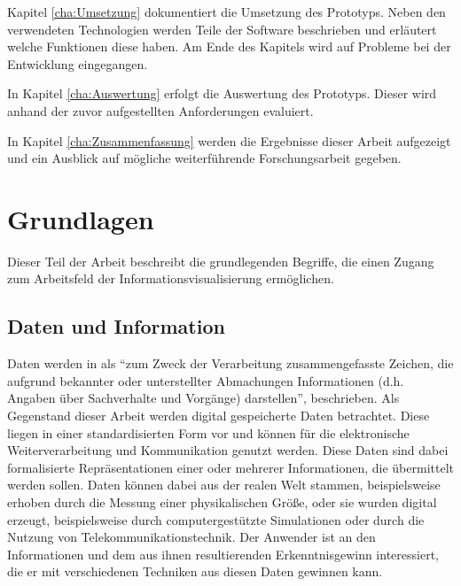 \documentclass[a4paper, 
               12pt,
               DIV=calc,
               version=first,
               pdftex,
               headsepline,
               footsepline,
               bibtotocnumbered,
               liststotocnumbered]{scrreprt}
\begin{document}
Kapitel \ref{cha:Umsetzung} dokumentiert die Umsetzung des Prototyps. Neben den verwendeten
Technologien werden Teile der Software beschrieben und erläutert welche Funktionen diese haben.
Am Ende des Kapitels wird auf Probleme bei der Entwicklung eingegangen.

In Kapitel \ref{cha:Auswertung} erfolgt die Auswertung des Prototyps. Dieser wird anhand der zuvor
aufgestellten Anforderungen evaluiert.

In Kapitel \ref{cha:Zusammenfassung} werden die Ergebnisse dieser Arbeit aufgezeigt und ein
Ausblick auf mögliche weiterführende Forschungsarbeit gegeben.

\chapter{Grundlagen}
\label{cha:Grundlagen}
Dieser Teil der Arbeit beschreibt die grundlegenden Begriffe, die einen Zugang
zum Arbeitsfeld der Informationsvisualisierung ermöglichen.
\section{Daten und Information}
\label{sec:DatenInfo}
Daten werden in \citep{Gabler} als "`zum Zweck der Verarbeitung zusammengefasste Zeichen,
die aufgrund bekannter oder unterstellter Abmachungen
Informationen (d.h. Angaben über Sachverhalte und Vorgänge) darstellen"', beschrieben.
Als Gegenstand dieser Arbeit werden digital gespeicherte Daten betrachtet.
Diese liegen in einer standardisierten Form vor und können für die elektronische Weiterverarbeitung
und Kommunikation genutzt werden. Diese Daten sind dabei formalisierte Repräsentationen einer
oder mehrerer Informationen, die übermittelt werden sollen.
Daten können dabei aus der realen Welt stammen, beispielsweise erhoben durch
die Messung einer physikalischen Größe, oder sie wurden digital erzeugt, beispielsweise durch
computergestützte Simulationen oder durch die Nutzung von Telekommunikationstechnik.
Der Anwender ist an den Informationen und dem aus ihnen resultierenden Erkenntnisgewinn interessiert, die er mit verschiedenen
Techniken aus diesen Daten gewinnen kann.
\end{document}
